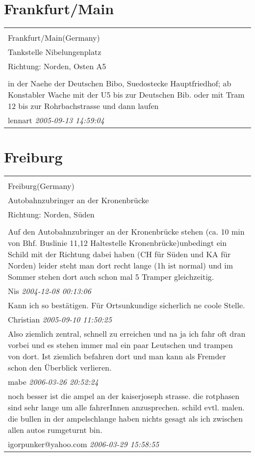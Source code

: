 \documentclass[a4paper,12pt]{article}
\begin{document}
\section{Frankfurt/Main}
\begin{tabular}{|p{13cm}|}
\hline\\
Frankfurt/Main(Germany)\\
Tankstelle Nibelungenplatz\\
Richtung: Norden, Osten A5 \\
\hline\\
in der Naehe der Deutschen Bibo, Suedostecke Hauptfriedhof; ab Konstabler Wache mit der U5 bis zur Deutschen Bib. oder mit Tram 12 bis zur Rohrbachstrasse und dann laufen \\
lennart \textit{ 2005-09-13 14:59:04 }\\\hline
\end{tabular}


\section{Freiburg}
\begin{tabular}{|p{13cm}|}
\hline\\
Freiburg(Germany)\\
Autobahnzubringer an der Kronenbrücke\\
Richtung: Norden, Süden \\
\hline\\
Auf den Autobahnzubringer an der Kronenbrücke stehen (ca. 10 min von Bhf. Buslinie 11,12 Haltestelle Kronenbrücke)unbedingt ein Schild mit der Richtung dabei haben (CH für Süden und KA für Norden) leider steht man dort recht lange (1h ist normal) und im Sommer stehen dort auch schon mal 5 Tramper gleichzeitig. \\
Nis \textit{ 2004-12-08 00:13:06 }\\\hline Kann ich so bestätigen. Für Ortsunkundige sicherlich ne coole Stelle. \\
Christian \textit{ 2005-09-10 11:50:25 }\\\hline Also ziemlich zentral, schnell zu erreichen und na ja ich fahr oft dran vorbei und es stehen immer mal ein paar Leutschen und trampen von dort. Ist ziemlich befahren dort und man kann als Fremder schon den Überblick verlieren. \\
mabe \textit{ 2006-03-26 20:52:24 }\\\hline noch besser ist die ampel an der kaiserjoseph strasse. die rotphasen sind sehr lange um alle fahrerInnen anzusprechen. schild evtl. malen. die bullen in der ampelschlange haben nichts gesagt als ich zwischen allen autos rumgeturnt bin. \\
igorpunker@yahoo.com \textit{ 2006-03-29 15:58:55 }\\\hline
\end{tabular}
\end{document}

